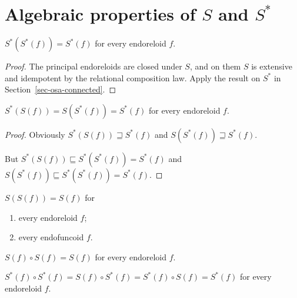 \section{\texorpdfstring{Algebraic properties of $S$ and $S^{\ast}$}%
{Algebraic properties of S and S*}}
\begin{thm}
$S^{\ast}(S^{\ast}(f))=S^{\ast}(f)$ for every endoreloid $f$.\end{thm}
\begin{proof}
The principal endoreloids are closed under $S$, and on them
$S$ is extensive and idempotent by the relational composition
law. Apply the result on $S^\ast$ in
Section~\ref{sec-osa-connected}.
\end{proof}
\begin{cor}
$S^{\ast}(S(f))=S(S^{\ast}(f))=S^{\ast}(f)$ for every endoreloid
$f$.\end{cor}
\begin{proof}
Obviously $S^{\ast}(S(f))\sqsupseteq S^{\ast}(f)$ and $S(S^{\ast}(f))\sqsupseteq S^{\ast}(f)$.

But $S^{\ast}(S(f))\sqsubseteq S^{\ast}(S^{\ast}(f))=S^{\ast}(f)$
and $S(S^{\ast}(f))\sqsubseteq S^{\ast}(S^{\ast}(f))=S^{\ast}(f)$.\end{proof}
\begin{conjecture}
$S(S(f))=S(f)$ for
\begin{enumerate}
\item every endoreloid $f$;
\item every endofuncoid $f$.
\end{enumerate}
\end{conjecture}

\begin{conjecture}
$S(f)\circ S(f)=S(f)$ for every endoreloid $f$.
\end{conjecture}

\begin{thm}
$S^{\ast}(f)\circ S^{\ast}(f) = S(f)\circ S^{\ast}(f)=S^{\ast}(f)\circ S(f)=S^{\ast}(f)$ for every endoreloid $f$.
\end{thm}

